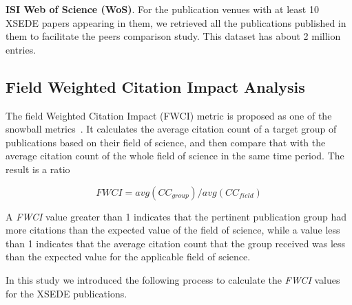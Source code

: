 \documentclass{sig-alternate}
\begin{document}
\parindent 0pt \textbf{ISI Web of Science (WoS)}. For the publication
venues with at least 10 XSEDE papers appearing in them, we retrieved
all the publications published in them to facilitate the peers
comparison study. This dataset has about 2 million entries.

\subsection{Field Weighted Citation Impact Analysis}

The field Weighted Citation Impact (FWCI) metric is proposed as one of
the snowball metrics~\cite{colledge2014snowball}. It calculates the
average citation count of a target group of publications based on
their field of science, and then compare that with the average
citation count of the whole field of science in the same time
period. The result is a ratio

\[ FWCI = avg(CC_{group})/avg(CC_{field}) \]

A \emph{FWCI} value greater than 1 indicates that the pertinent
publication group had more citations than the expected value of the
field of science, while a value less than 1 indicates that the average
citation count that the group received was less than the expected
value for the applicable field of science.

In this study we introduced the following process to calculate the \emph{FWCI}
values for the XSEDE publications.
\end{document}
